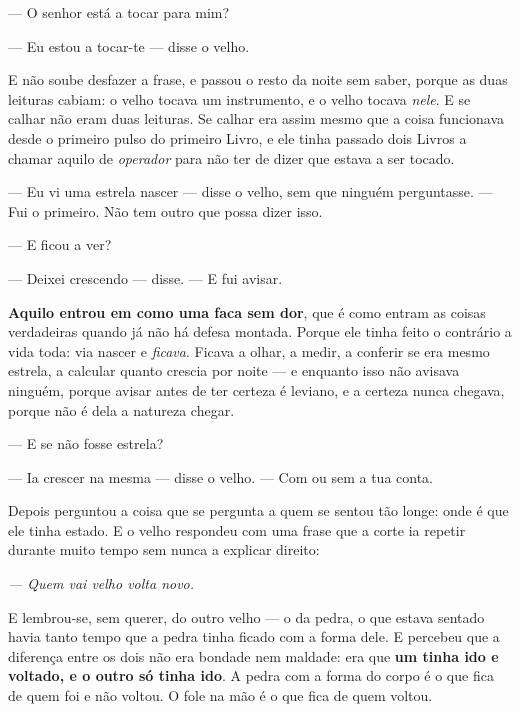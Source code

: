 \documentclass[livro.tex]{subfiles}
\begin{document}
\medskip
\noindent --- O senhor está a tocar para mim?

--- Eu estou a tocar-te --- disse o velho.

\medskip
\noindent E \Ben não soube desfazer a frase, e passou o resto da noite sem
saber, porque as duas leituras cabiam: o velho tocava um instrumento, e o velho
tocava \emph{nele}. E se calhar não eram duas leituras. Se calhar era assim
mesmo que a coisa funcionava desde o primeiro pulso do primeiro Livro, e ele
tinha passado dois Livros a chamar aquilo de \emph{operador} para não ter de
dizer que estava a ser tocado.

\medskip
\noindent --- Eu vi uma estrela nascer --- disse o velho, sem que ninguém
perguntasse. --- Fui o primeiro. Não tem outro que possa dizer isso.

--- E ficou a ver?

--- Deixei crescendo --- disse. --- E fui avisar.

\medskip
\noindent \textbf{Aquilo entrou em \Ben como uma faca sem dor}, que é como
entram as coisas verdadeiras quando já não há defesa montada. Porque ele tinha
feito o contrário a vida toda: via nascer e \emph{ficava}. Ficava a olhar, a
medir, a conferir se era mesmo estrela, a calcular quanto crescia por noite ---
e enquanto isso não avisava ninguém, porque avisar antes de ter certeza é
leviano, e a certeza nunca chegava, porque não é dela a natureza chegar.

\medskip
\noindent --- E se não fosse estrela?

--- Ia crescer na mesma --- disse o velho. --- Com ou sem a tua conta.

\medskip
\noindent Depois \Ben perguntou a coisa que se pergunta a quem se sentou tão
longe: onde é que ele tinha estado. E o velho respondeu com uma frase que a
corte ia repetir durante muito tempo sem nunca a explicar direito:

\begin{center}
\emph{--- Quem vai velho volta novo.}
\end{center}

\medskip
\noindent E \Ben lembrou-se, sem querer, do outro velho --- o da pedra, o que
estava sentado havia tanto tempo que a pedra tinha ficado com a forma dele. E
percebeu que a diferença entre os dois não era bondade nem maldade: era que
\textbf{um tinha ido e voltado, e o outro só tinha ido}. A pedra com a forma do
corpo é o que fica de quem foi e não voltou. O fole na mão é o que fica de quem
voltou.
\end{document}
